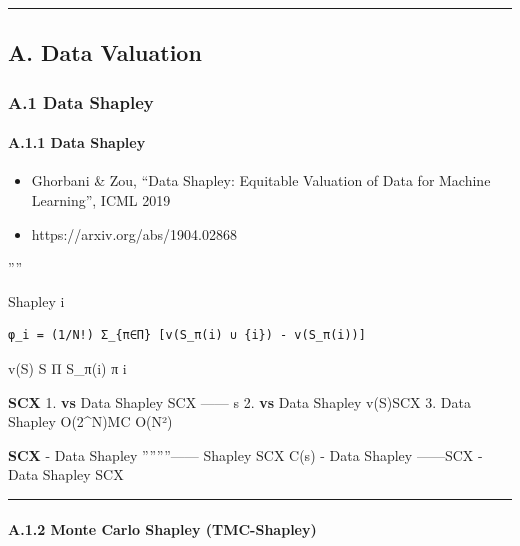 \documentclass[
  12pt,
]{article}
\providecommand{\tightlist}{%
  \setlength{\itemsep}{0pt}\setlength{\parskip}{0pt}}
\begin{document}
\begin{center}\rule{0.5\linewidth}{0.5pt}\end{center}

\subsection{A. Data Valuation
}\label{a.-data-valuation-ux65b9ux6cd5}

\subsubsection{A.1 Data Shapley
}\label{a.1-data-shapley-ux53caux5176ux53d8ux4f53}

\paragraph{A.1.1  Data
Shapley}\label{a.1.1-ux7ecfux5178-data-shapley}

\begin{itemize}
\tightlist
\item
  \textbf{}Ghorbani \& Zou, ``Data Shapley: Equitable Valuation of
  Data for Machine Learning'', ICML 2019
\item
  \textbf{}https://arxiv.org/abs/1904.02868
\end{itemize}

\textbf{}''''

\textbf{} Shapley  i

\begin{verbatim}
φ_i = (1/N!) Σ_{π∈Π} [v(S_π(i) ∪ {i}) - v(S_π(i))]
\end{verbatim}

 v(S)  S Π S\_π(i)  π 
i 

\textbf{ SCX } 1. \textbf{ vs }Data
Shapley SCX
------ s
 2. \textbf{
vs }Data Shapley  v(S)SCX  3.
\textbf{}Data Shapley  O(2\^{}N)MC  O(N²)


\textbf{SCX } - Data Shapley
''''''''------
Shapley SCX  C(s)  - Data Shapley
------SCX
 - Data Shapley SCX


\begin{center}\rule{0.5\linewidth}{0.5pt}\end{center}

\paragraph{A.1.2  Monte Carlo Shapley
(TMC-Shapley)}\label{a.1.2-ux622aux65ad-monte-carlo-shapley-tmc-shapley}
\end{document}
